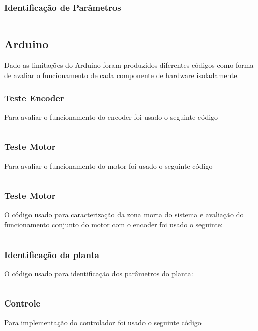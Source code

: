 \documentclass[a4paper,11pt]{article}
\begin{document}
\newpage
\subsubsection*{Identificação de Parâmetros}
\inputminted[xleftmargin=15pt,linenos,frame=single,framesep=5pt,breaklines=true]{matlab}{../matlab/identification.m}

\newpage
\subsection*{Arduino}
Dado as limitações do Arduino foram produzidos diferentes códigos como forma de avaliar o funcionamento de cada componente de hardware isoladamente.

\subsubsection*{Teste Encoder}
Para avaliar o funcionamento do encoder foi usado o seguinte código
\inputminted[xleftmargin=15pt,linenos,frame=single,framesep=5pt,breaklines=true]{c++}{../arduino/test_enconder/test_enconder.ino}

\newpage
\subsubsection*{Teste Motor}
Para avaliar o funcionamento do motor foi usado o seguinte código
\inputminted[xleftmargin=15pt,linenos,frame=single,framesep=5pt,breaklines=true]{c++}{../arduino/test_dcmotor/test_dcmotor.ino}

\newpage
\subsubsection*{Teste Motor}
O código usado para caracterização da zona morta do sistema e avaliação do funcionamento conjunto do motor com o encoder foi usado o seguinte:
\inputminted[xleftmargin=15pt,linenos,frame=single,framesep=5pt,breaklines=true]{c++}{../arduino/test_dcmotor_characterization/test_dcmotor_characterization.ino}

\newpage
\subsubsection*{Identificação da planta}
O código usado para identificação dos parâmetros do planta:
\inputminted[xleftmargin=15pt,linenos,frame=single,framesep=5pt,breaklines=true]{c++}{../arduino/test_dcmotor_pulses/test_dcmotor_pulses.ino}


\newpage
\subsubsection*{Controle}
Para implementação do controlador foi usado o seguinte código
\inputminted[xleftmargin=15pt,linenos,frame=single,framesep=5pt,breaklines=true]{c++}{../arduino/pid_control/pid_control.ino}

\end{document}
